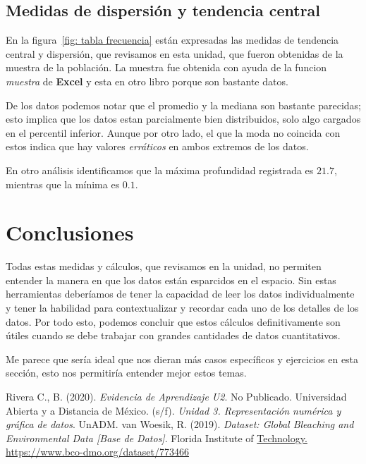 \documentclass[12pt]{article}
\begin{document}
	

\subsection{Medidas de dispersión y tendencia central}

	\par En la figura~\ref{fig: tabla frecuencia} están expresadas las medidas de tendencia central y dispersión, que revisamos en esta unidad, que fueron obtenidas de la muestra de la población. La muestra fue obtenida con ayuda de la funcion \textit{muestra} de \textbf{Excel} y esta en otro libro porque son bastante datos.
	\par De los datos podemos notar que el promedio y la mediana son bastante parecidas; esto implica que los datos estan parcialmente bien distribuidos, solo algo cargados en el percentil inferior. Aunque por otro lado, el que la moda no coincida con estos indica que hay valores \textit{erráticos} en ambos extremos de los datos.
	\par En otro análisis identificamos que la máxima profundidad registrada es $21.7$, mientras que la mínima es $0.1$.
	





\section{Conclusiones}

	\par Todas estas medidas y cálculos, que revisamos en la unidad, no permiten entender la manera en que los datos están esparcidos en el espacio. Sin estas herramientas deberíamos de tener la capacidad de leer los datos individualmente y tener la habilidad para contextualizar y recordar cada uno de los detalles de los datos. Por todo esto, podemos concluir que estos cálculos definitivamente son útiles cuando se debe trabajar con grandes cantidades de datos cuantitativos.
	\par Me parece que sería ideal que nos dieran más casos específicos y ejercicios en esta sección, esto nos permitiría entender mejor estos temas.




\begin{thebibliography}{X}
	 Rivera C., B. (2020). \textit{Evidencia de Aprendizaje U2}. No Publicado.
	 Universidad Abierta y a Distancia de México. (s/f). \textit{Unidad 3. Representación numérica y gráfica de datos}. UnADM.
	 van Woesik, R. (2019). \textit{Dataset: Global Bleaching and Environmental Data [Base de Datos]}. Florida Institute of \url{Technology. https://www.bco-dmo.org/dataset/773466}
 
\end{thebibliography}
\end{document}
